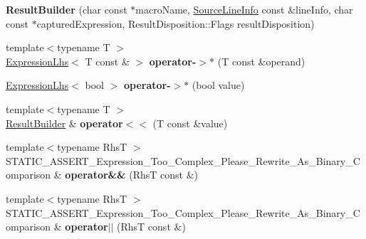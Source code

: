 \begin{DoxyCompactItemize}
\item 
\hypertarget{classCatch_1_1ResultBuilder_a18c2929702bdde1f835e39717a0e554b}{
{\bfseries ResultBuilder} (char const $\ast$macroName, \hyperlink{structCatch_1_1SourceLineInfo}{SourceLineInfo} const \&lineInfo, char const $\ast$capturedExpression, ResultDisposition::Flags resultDisposition)}
\label{classCatch_1_1ResultBuilder_a18c2929702bdde1f835e39717a0e554b}

\item 
\hypertarget{classCatch_1_1ResultBuilder_a05d9a4e3d9acce532c5fd42ca526132d}{
{\footnotesize template$<$typename T $>$ }\\\hyperlink{classCatch_1_1ExpressionLhs}{ExpressionLhs}$<$ T const \& $>$ {\bfseries operator-\/$>$$\ast$} (T const \&operand)}
\label{classCatch_1_1ResultBuilder_a05d9a4e3d9acce532c5fd42ca526132d}

\item 
\hypertarget{classCatch_1_1ResultBuilder_af2b2645b38c8dca2de0b83650383c6bd}{
\hyperlink{classCatch_1_1ExpressionLhs}{ExpressionLhs}$<$ bool $>$ {\bfseries operator-\/$>$$\ast$} (bool value)}
\label{classCatch_1_1ResultBuilder_af2b2645b38c8dca2de0b83650383c6bd}

\item 
\hypertarget{classCatch_1_1ResultBuilder_a50f54eb51e27a7fecd5302ea9f861f98}{
{\footnotesize template$<$typename T $>$ }\\\hyperlink{classCatch_1_1ResultBuilder}{ResultBuilder} \& {\bfseries operator$<$$<$} (T const \&value)}
\label{classCatch_1_1ResultBuilder_a50f54eb51e27a7fecd5302ea9f861f98}

\item 
\hypertarget{classCatch_1_1ResultBuilder_a10c4fcc2a09a38c19981b19e03f728c6}{
{\footnotesize template$<$typename RhsT $>$ }\\STATIC\_\-ASSERT\_\-Expression\_\-Too\_\-Complex\_\-Please\_\-Rewrite\_\-As\_\-Binary\_\-Comparison \& {\bfseries operator\&\&} (RhsT const \&)}
\label{classCatch_1_1ResultBuilder_a10c4fcc2a09a38c19981b19e03f728c6}

\item 
\hypertarget{classCatch_1_1ResultBuilder_a592ebee750d1bf77c5ee2db0079c4e90}{
{\footnotesize template$<$typename RhsT $>$ }\\STATIC\_\-ASSERT\_\-Expression\_\-Too\_\-Complex\_\-Please\_\-Rewrite\_\-As\_\-Binary\_\-Comparison \& {\bfseries operator$|$$|$} (RhsT const \&)}
\label{classCatch_1_1ResultBuilder_a592ebee750d1bf77c5ee2db0079c4e90}


\end{DoxyCompactItemize}
